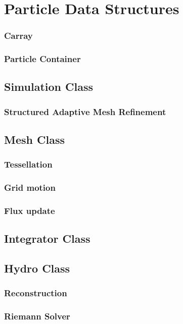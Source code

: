 

\section{Particle Data Structures}
\subsubsection{Carray}
\subsubsection{Particle Container}

\subsection{Simulation Class}
\subsubsection{Structured Adaptive Mesh Refinement}

\subsection{Mesh Class}
\subsubsection{Tessellation}
\subsubsection{Grid motion}
\subsubsection{Flux update}

\subsection{Integrator Class}

\subsection{Hydro Class}
\subsubsection{Reconstruction}
\subsubsection{Riemann Solver}

